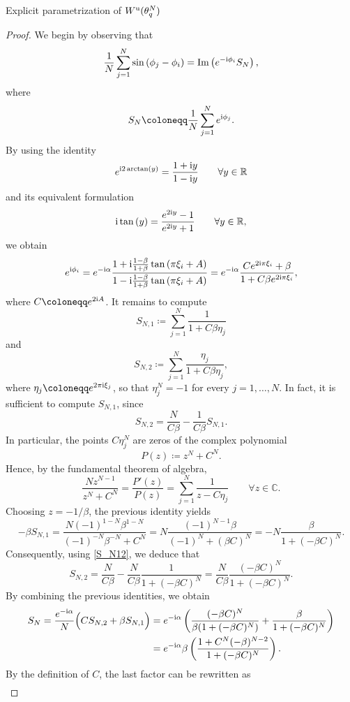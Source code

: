 \documentclass{article}
\theoremstyle{definition}
\newcommand{\R}{\mathbb{R}}
\newcommand{\C}{\mathbb{C}}
\renewcommand{\u}{\textnormal{u}}
\renewcommand{\i}{\textnormal{i}}
\begin{document}
\begin{section}{Explicit parametrization of $W^\u(\theta^N_q)$}
\begin{proof}
    We begin by observing that
    $$\frac{1}{N}\sum_{j=1}^N\sin\left(\phi_j-\phi_i\right)=\textnormal{Im}\left(e^{-\i \phi_i} S_N\right),$$
    where
    $$S_N\coloneqq\frac{1}{N}\sum_{j=1}^Ne^{\i \phi_j}.$$
    By using the identity
    $$e^{\i 2\arctan(y)}=\frac{1+\i y}{1-\i y} \qquad\forall y\in\R$$
    and its equivalent formulation
    $$\i \tan\left(y\right)=\frac{e^{2\i y}-1}{e^{2\i y}+1}\qquad\forall y\in\R,$$
    we obtain
    \begin{equation}\label{exp_expression}
        e^{\i \phi_i}=e^{-\i \alpha}\frac{1+\i\frac{1-\beta}{1+\beta}\tan\left(\pi\xi_i+A\right)}{1-\i\frac{1-\beta}{1+\beta}\tan\left(\pi\xi_i+A\right)}=e^{-\i \alpha}\frac{Ce^{2\i \pi\xi_i}+\beta}{1+C\beta e^{2\i\pi\xi_i}},  
    \end{equation}
    where $C\coloneqq e^{2\i A}$. It remains to compute
    $$S_{N,1}\coloneqq\sum_{j=1}^N \frac{1}{1+C\beta \eta_j}$$
    and
    $$S_{N,2}\coloneqq\sum_{j=1}^N \frac{\eta_j}{1+C\beta \eta_j},$$
    where $\eta_j\coloneqq e^{2\pi\i\xi_j}$, so that $\eta_j^N=-1$ for every $j=1,\ldots,N$. In fact, it is sufficient to compute $S_{N,1}$, since
    \begin{equation}\label{S_N12}
        S_{N,2}=\frac{N}{C\beta}-\frac{1}{C\beta}S_{N,1}.
    \end{equation}
    In particular, the points $C\eta_j^N$ are zeros of the complex polynomial
    $$P(z)\coloneqq z^N+C^N.$$
    Hence, by the fundamental theorem of algebra,
    $$\frac{Nz^{N-1}}{z^N+C^N}=\frac{P'(z)}{P(z)}=\sum_{j=1}^N\frac{1}{z-C\eta_j}\qquad\forall z\in\C.$$
    Choosing $z=-1/\beta$, the previous identity yields
    $$-\beta S_{N,1}=\frac{N(-1)^{1-N}\beta^{1-N}}{(-1)^{-N}\beta^{-N}+C^N}=N\frac{(-1)^{N-1}\beta}{(-1)^N+(\beta C)^N}=-N\frac{\beta}{1+(-\beta C)^N}.$$
    Consequently, using \eqref{S_N12}, we deduce that
    $$S_{N,2}=\frac{N}{C\beta}-\frac{N}{C\beta} \frac{1}{1+(-\beta C)^N}=\frac{N}{C\beta}\frac{(-\beta C)^N}{1+(-\beta C)^N}.$$
    By combining the previous identities, we obtain
    \begin{align*}
        S_N=\frac{e^{-\i \alpha}}{N}\Big(CS_{N,2}+\beta S_{N,1}\Big)
        &=e^{-\i \alpha}\left(\frac{(-\beta C)^N}{\beta(1+(-\beta C)^N)}+\frac{\beta}{1+(-\beta C)^N}\right)\\
        &=e^{-\i \alpha}\beta\left(\frac{1+C^N(-\beta)^{N-2}}{1+(-\beta C)^N}\right).
    \end{align*}
    By the definition of $C$, the last factor can be rewritten as
    \begin{align*}

\end{align*}
\end{proof}
\end{section}
\end{document}
